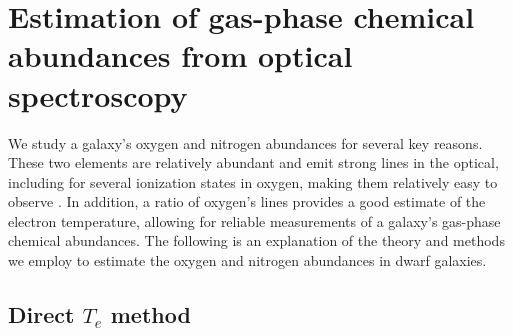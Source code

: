 

%
%
\section[Theory]{Estimation of gas-phase chemical abundances from optical spectroscopy}

We study a galaxy's oxygen and nitrogen abundances for several key reasons.  
These two elements are relatively abundant and emit strong lines in the optical, 
including for several ionization states in oxygen, making them relatively easy 
to observe \citep{Kewley02}.  In addition, a ratio of oxygen's lines provides a 
good estimate of the electron temperature, allowing for reliable measurements of 
a galaxy's gas-phase chemical abundances.  The following is an explanation of 
the theory and methods we employ to estimate the oxygen and nitrogen abundances 
in dwarf galaxies.


\subsection{Direct $T_e$ method}\label{sec:DirectTe}

